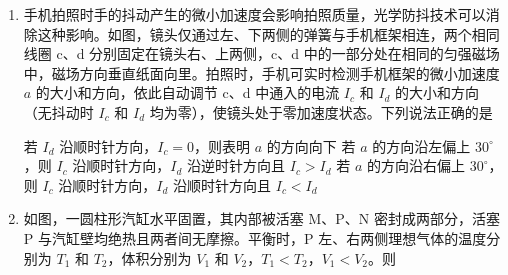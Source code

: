 \documentclass[\gkver]{gaokaozhenti}
\begin{document}
\begin{enumerate}
{故选 AD。
}

\item
手机拍照时手的抖动产生的微小加速度会影响拍照质量，光学防抖技术可以消除这种影响。如图，镜头仅通过左、下两侧的弹簧与手机框架相连，两个相同线圈 c、d 分别固定在镜头右、上两侧，c、d 中的一部分处在相同的匀强磁场中，磁场方向垂直纸面向里。拍照时，手机可实时检测手机框架的微小加速度 $a$ 的大小和方向，依此自动调节 c、d 中通入的电流 $I_{c}$ 和 $I_{d}$ 的大小和方向（无抖动时 $I_{c}$ 和 $I_{d}$ 均为零），使镜头处于零加速度状态。下列说法正确的是


{若 $I_{d}$ 沿顺时针方向，$I_{c} = 0$，则表明 $a$ 的方向向下}
{若 $a$ 的方向沿左偏上 $30^\circ$，则 $I_{c}$ 沿顺时针方向，$I_{d}$ 沿逆时针方向且 $I_{c} > I_{d}$}
{若 $a$ 的方向沿右偏上 $30^\circ$，则 $I_{c}$ 沿顺时针方向，$I_{d}$ 沿顺时针方向且 $I_{c} < I_{d}$}


\item
如图，一圆柱形汽缸水平固置，其内部被活塞 M、P、N 密封成两部分，活塞 P 与汽缸壁均绝热且两者间无摩擦。平衡时，P 左、右两侧理想气体的温度分别为 $T_{1}$ 和 $T_{2}$，体积分别为 $V_{1}$ 和 $V_{2}$，$T_{1} < T_{2}$，$V_{1} < V_{2}$。则


\end{enumerate}
\end{document}
